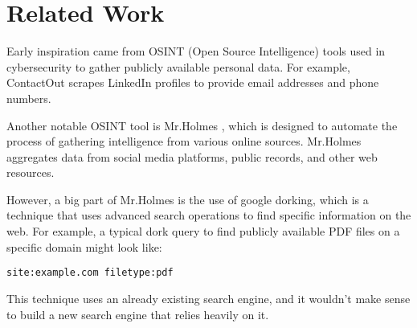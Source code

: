 \section{Related Work}

Early inspiration came from OSINT (Open Source Intelligence) tools used in cybersecurity to gather publicly available personal data. For example, ContactOut \cite{contactout} scrapes LinkedIn profiles to provide email addresses and phone numbers. 

Another notable OSINT tool is Mr.Holmes \cite{mrholmes}, which is designed to automate the process of gathering intelligence from various online sources. Mr.Holmes aggregates data from social media platforms, public records, and other web resources.

However, a big part of Mr.Holmes is the use of google dorking, which is a technique that uses advanced search operations to find specific information on the web. For example, a typical dork query to find publicly available PDF files on a specific domain might look like:
\begin{verbatim}
site:example.com filetype:pdf
\end{verbatim}
This technique uses an already existing search engine, and it wouldn't make sense to build a new search engine that relies heavily on it.


